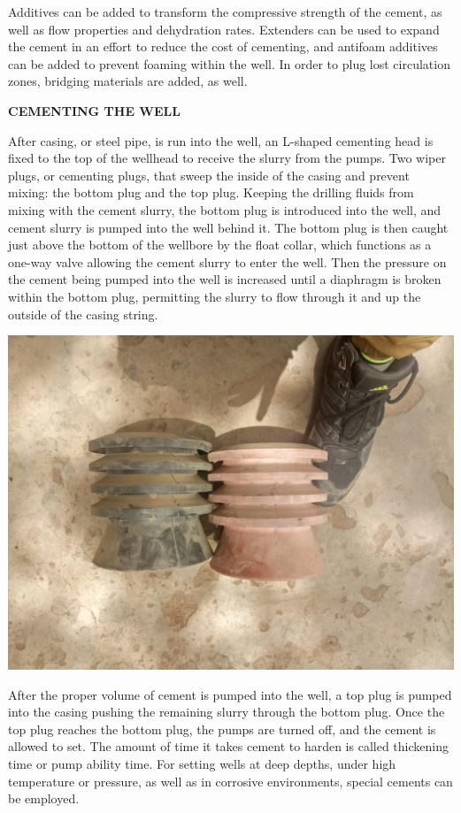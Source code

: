 \vspace{1em}

Additives can be added to transform the compressive strength of the cement,
as well as flow properties and dehydration rates. Extenders can be used to 
expand the cement in an effort to reduce the cost of cementing, and antifoam additives
can be added to prevent foaming within the well. In order to plug lost circulation zones, 
bridging materials are added, as well.

\vspace{1em}

\textbf{CEMENTING THE WELL}

\vspace{1em}

After casing, or steel pipe, is run into the well, an L-shaped cementing 
head is fixed to the top of the wellhead to receive the slurry from the pumps. 
Two wiper plugs, or cementing plugs, that sweep the
inside of the casing and prevent mixing: the bottom plug and the top plug.
Keeping the drilling fluids from mixing with the cement slurry, 
the bottom plug is introduced into the well, and cement slurry is pumped into the well behind it. 
The bottom plug is then caught just above the bottom of the wellbore by the float collar, 
which functions as a one-way valve allowing the cement slurry to enter the well.
Then the pressure on the cement being pumped into the well is increased until a diaphragm is broken within the bottom plug,
 permitting the slurry to flow through it and up the outside of the casing string.


\vspace{1em}

\includegraphics[scale=0.3]{images/top_plugandbottom_plug}


After the proper volume of cement is pumped into the well, a top plug is pumped into 
the casing pushing the remaining slurry through the bottom plug.
 Once the top plug reaches the bottom plug, the pumps are turned off, and the cement is allowed to set.
The amount of time it takes cement to harden is called thickening time or pump ability time. 
For setting wells at deep depths, under high temperature or pressure, as well as in corrosive environments,
 special cements can be employed.


    